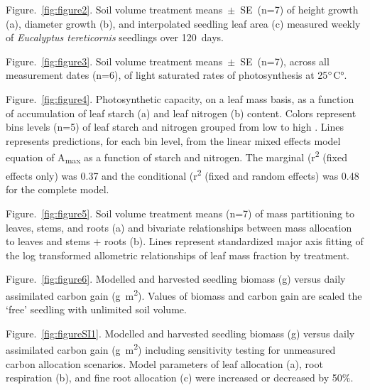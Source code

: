 \documentclass[a4paper]{article}\usepackage[]{graphicx}\usepackage[]{color}
\begin{document}
Figure.~\ref{fig:figure2}. Soil volume treatment means~$\pm$~SE~(n=7) of height growth (a), diameter growth (b), and interpolated seedling leaf area (c) measured weekly of \textit{Eucalyptus tereticornis} seedlings over 120~days.

Figure.~\ref{fig:figure3}. Soil volume treatment means~$\pm$~SE~(n=7), across all measurement dates (n=6), of light saturated rates of photosynthesis at 25$\degree$C°.

Figure.~\ref{fig:figure4}. Photosynthetic capacity, on a leaf mass basis, as a function of accumulation of leaf starch (a) and leaf nitrogen  (b) content.  Colors represent bins levels (n=5) of leaf starch and nitrogen grouped from low to high .  Lines represents predictions, for each bin level, from the linear mixed effects model equation of A\textsubscript{max} as a function of starch and nitrogen. The marginal (r\textsuperscript{2} (fixed effects only) was 0.37 and the conditional (r\textsuperscript{2} (fixed and random effects) was 0.48 for the complete model.

Figure.~\ref{fig:figure5}. Soil volume treatment means (n=7) of mass partitioning to leaves, stems, and roots (a) and bivariate relationships between mass allocation to leaves and stems + roots (b). Lines represent standardized major axis fitting of the log transformed allometric relationships of leaf mass fraction by treatment. 

Figure.~\ref{fig:figure6}. Modelled and harvested seedling biomass (g) versus daily assimilated carbon gain (g~m\textsuperscript{2}).  Values of biomass and carbon gain are scaled the ‘free’ seedling with unlimited soil volume. 

Figure.~\ref{fig:figureSI1}. Modelled and harvested seedling biomass (g) versus daily assimilated carbon gain (g~m\textsuperscript{2}) including sensitivity testing for unmeasured carbon allocation scenarios.  Model parameters of leaf allocation (a), root respiration (b), and fine root allocation (c) were increased or decreased by 50$\%$.

\end{document}
